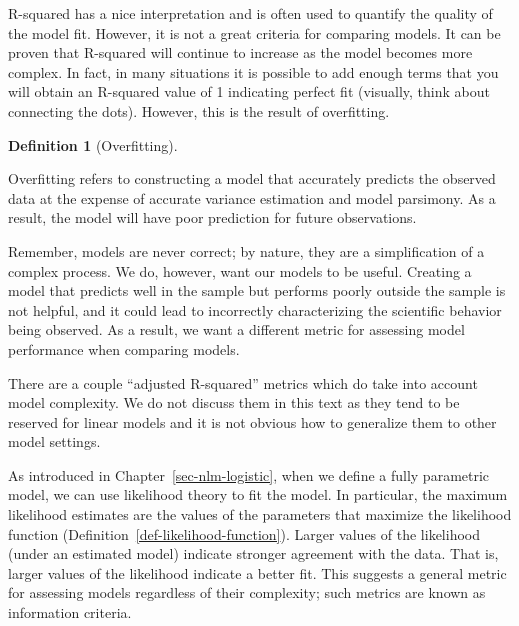 \documentclass[
  letterpaper,
  DIV=11,
  numbers=noendperiod]{scrreprt}
\theoremstyle{definition}
\newtheorem{definition}{Definition}[chapter]
\theoremstyle{definition}
\theoremstyle{remark}
\begin{document}
R-squared has a nice interpretation and is often used to quantify the
quality of the model fit. However, it is not a great criteria for
comparing models. It can be proven that R-squared will continue to
increase as the model becomes more complex. In fact, in many situations
it is possible to add enough terms that you will obtain an R-squared
value of 1 indicating perfect fit (visually, think about connecting the
dots). However, this is the result of overfitting.

\begin{definition}[Overfitting]\protect\hypertarget{def-overfitting}{}\label{def-overfitting}

Overfitting refers to constructing a model that accurately predicts the
observed data at the expense of accurate variance estimation and model
parsimony. As a result, the model will have poor prediction for future
observations.

\end{definition}

Remember, models are never correct; by nature, they are a simplification
of a complex process. We do, however, want our models to be useful.
Creating a model that predicts well in the sample but performs poorly
outside the sample is not helpful, and it could lead to incorrectly
characterizing the scientific behavior being observed. As a result, we
want a different metric for assessing model performance when comparing
models.

\begin{tcolorbox}[enhanced jigsaw, left=2mm, toprule=.15mm, arc=.35mm, breakable, opacitybacktitle=0.6, opacityback=0, rightrule=.15mm, colbacktitle=quarto-callout-note-color!10!white, coltitle=black, leftrule=.75mm, toptitle=1mm, colframe=quarto-callout-note-color-frame, titlerule=0mm, title=\textcolor{quarto-callout-note-color}{\faInfo}\hspace{0.5em}{Note}, bottomrule=.15mm, colback=white, bottomtitle=1mm]

There are a couple ``adjusted R-squared'' metrics which do take into
account model complexity. We do not discuss them in this text as they
tend to be reserved for linear models and it is not obvious how to
generalize them to other model settings.

\end{tcolorbox}

As introduced in Chapter~\ref{sec-nlm-logistic}, when we define a fully
parametric model, we can use likelihood theory to fit the model. In
particular, the maximum likelihood estimates are the values of the
parameters that maximize the likelihood function
(Definition~\ref{def-likelihood-function}). Larger values of the
likelihood (under an estimated model) indicate stronger agreement with
the data. That is, larger values of the likelihood indicate a better
fit. This suggests a general metric for assessing models regardless of
their complexity; such metrics are known as information criteria.
\end{document}

